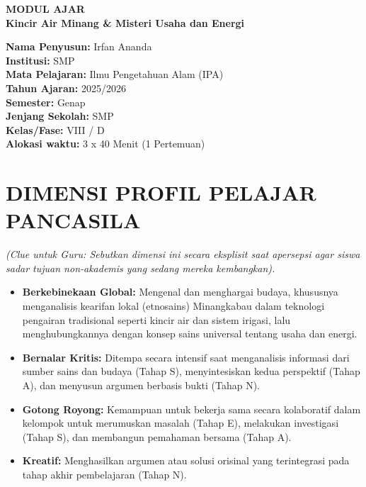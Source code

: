 \documentclass[12pt,a4paper]{article}
\begin{document}
\begin{center}
{\Huge\textbf{MODUL AJAR}}\\
\vspace{0.5cm}
{\Large\textbf{Kincir Air Minang \& Misteri Usaha dan Energi}}
\end{center}

\vspace{1cm}

\begin{tcolorbox}[colback=white,colframe=black,boxrule=1pt]
\textbf{Nama Penyusun:} Irfan Ananda\\
\textbf{Institusi:} SMP\\
\textbf{Mata Pelajaran:} Ilmu Pengetahuan Alam (IPA)\\
\textbf{Tahun Ajaran:} 2025/2026\\
\textbf{Semester:} Genap\\
\textbf{Jenjang Sekolah:} SMP\\
\textbf{Kelas/Fase:} VIII / D\\
\textbf{Alokasi waktu:} 3 x 40 Menit (1 Pertemuan)
\end{tcolorbox}

\section{DIMENSI PROFIL PELAJAR PANCASILA}
\textit{(Clue untuk Guru: Sebutkan dimensi ini secara eksplisit saat apersepsi agar siswa sadar tujuan non-akademis yang sedang mereka kembangkan).}

\begin{itemize}
\item \textbf{Berkebinekaan Global:} Mengenal dan menghargai budaya, khususnya menganalisis kearifan lokal (etnosains) Minangkabau dalam teknologi pengairan tradisional seperti kincir air dan sistem irigasi, lalu menghubungkannya dengan konsep sains universal tentang usaha dan energi.
\item \textbf{Bernalar Kritis:} Ditempa secara intensif saat menganalisis informasi dari sumber sains dan budaya (Tahap S), menyintesiskan kedua perspektif (Tahap A), dan menyusun argumen berbasis bukti (Tahap N).
\item \textbf{Gotong Royong:} Kemampuan untuk bekerja sama secara kolaboratif dalam kelompok untuk merumuskan masalah (Tahap E), melakukan investigasi (Tahap S), dan membangun pemahaman bersama (Tahap A).
\item \textbf{Kreatif:} Menghasilkan argumen atau solusi orisinal yang terintegrasi pada tahap akhir pembelajaran (Tahap N).
\end{itemize}
\end{document}
